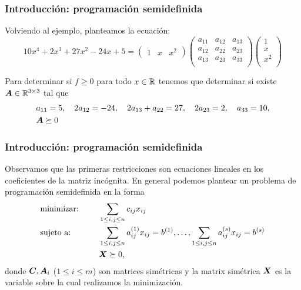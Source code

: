 \documentclass[aspectratio=169,12pt,spanish]{beamer}
\begin{document}
\begin{frame}
\frametitle{Introducción: programación semidefinida}

Volviendo al ejemplo, planteamos la ecuación:
$$10x^4+2x^3+27x^2-24x+5 =
\begin{pmatrix}
1 & x & x^2
\end{pmatrix}
\begin{pmatrix}
a_{11} & a_{12} & a_{13} \\
a_{12} & a_{22} & a_{23} \\
a_{13} & a_{23} & a_{33} \\
\end{pmatrix}
\begin{pmatrix}
1 \\
x \\
x^2 \\
\end{pmatrix}
$$

Para determinar si $f \ge 0$ para todo $x \in \mathbb{R}$ tenemos que determinar si existe $\bm{A} \in \mathbb{R}^{3 \times 3}$ tal que
\begin{align*}
&a_{11} = 5, \quad 2a_{12} = -24, \quad 2a_{13} + a_{22} = 27, \quad 2a_{23} = 2, \quad a_{33} = 10, \\
&\bm{A} \succeq 0
\end{align*}


\end{frame}



\begin{frame}
\frametitle{Introducción: programación semidefinida}

Observamos que las primeras restricciones son ecuaciones lineales en los coeficientes de la matriz incógnita. En general podemos plantear un problema de programación semidefinida en la forma
\begin{alignat*}{2}
  & \text{minimizar: }& \quad & \sum_{1\le i,j \le n} c_{ij} x_{ij} \\
  & \text{sujeto a: } & \quad & \sum_{1\le i,j \le n} a_{ij}^{(1)} x_{ij} = b^{(1)}, \dots, \sum_{1\le i,j \le n} a_{ij}^{(s)} x_{ij} = b^{(s)}\\
   && & \bm{X}\succeq 0,
\end{alignat*}
donde $\bm{C}, \bm{A}_i$ ($1 \le i \le m$) son matrices simétricas y la matrix simétrica $\bm{X}$ es la variable sobre la cual realizamos la minimización.

\end{frame}
\end{document}
